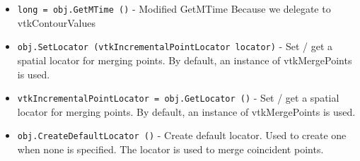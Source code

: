 \begin{itemize}
\item  \verb|long = obj.GetMTime ()| -  Modified GetMTime Because we delegate to vtkContourValues

\item  \verb|obj.SetLocator (vtkIncrementalPointLocator locator)| -  Set / get a spatial locator for merging points. By default, 
 an instance of vtkMergePoints is used.

\item  \verb|vtkIncrementalPointLocator = obj.GetLocator ()| -  Set / get a spatial locator for merging points. By default, 
 an instance of vtkMergePoints is used.

\item  \verb|obj.CreateDefaultLocator ()| -  Create default locator. Used to create one when none is
 specified. The locator is used to merge coincident points.

\end{itemize}
